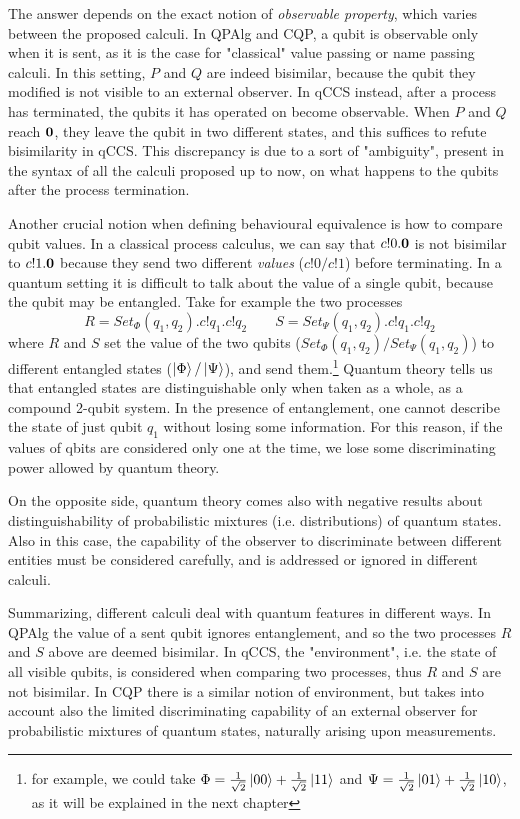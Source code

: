 The answer depends on the exact notion of \textit{observable property}, which varies between the proposed calculi. In QPAlg and CQP, a qubit is observable only when it is sent, as it is the case for "classical" value passing or name passing calculi. In this setting, $P$ and $Q$ are indeed bisimilar, because the qubit they modified is not visible to an external observer. In qCCS instead, after a process has terminated, the qubits it has operated on become observable. When $P$ and $Q$ reach $\mathbf{0}$, they leave the qubit in two different states, and this suffices to refute bisimilarity in qCCS. This discrepancy is due to a sort of "ambiguity", present in the syntax of all the calculi proposed up to now, on what happens to the qubits after the process termination.
 
 Another crucial notion when defining behavioural equivalence is how to compare qubit values. In a classical process calculus, we can say that $c!0.\mathbf{0}$ is not bisimilar to $c!1.\mathbf{0}$ because they send two different \textit{values} ($c!0 / c!1$) before terminating. In a quantum setting it is difficult to talk about the value of a single qubit, because the qubit may be entangled.  Take for example the two processes 
 \[R = Set_{\Phi}(q_1, q_2).c!q_1.c!q_2 \qquad 
   S = Set_{\Psi}(q_1, q_2).c!q_1.c!q_2\]
where $R$ and $S$ set the value of the two qubits ($Set_{\Phi}(q_1, q_2) / Set_{\Psi}(q_1, q_2)$) to different entangled states ($\ket{\Phi} / \ket{\Psi}$), and send them.\footnote{for example, we could take $\Phi = \frac{1}{\sqrt{2}}\ket{00} + \frac{1}{\sqrt{2}}\ket{11}$ and $\Psi = \frac{1}{\sqrt{2}}\ket{01} + \frac{1}{\sqrt{2}}\ket{10}$, as it will be explained in the next chapter} 
Quantum theory tells us that entangled states are distinguishable only when taken as a whole, as a compound 2-qubit system. In the presence of entanglement, one cannot describe the state of just qubit $q_1$ without losing some information. For this reason, if the values of qbits are considered only one at the time, we lose some discriminating power allowed by quantum theory.

On the opposite side, quantum theory comes also with negative results about distinguishability of probabilistic mixtures (i.e. distributions) of quantum states. Also in this case, the capability of the observer to discriminate between different entities must be considered carefully, and is addressed or ignored in different calculi.
 
Summarizing, different calculi deal with quantum features in different ways. In QPAlg the value of a sent qubit ignores entanglement, and so the two processes $R$ and $S$ above are deemed bisimilar. In qCCS, the "environment", i.e. the state of all visible qubits, is considered when comparing two processes, thus $R$ and $S$ are not bisimilar. In CQP there is a similar notion of environment, but takes into account also the limited discriminating capability of an external observer for probabilistic mixtures of quantum states, naturally arising upon measurements.
 
